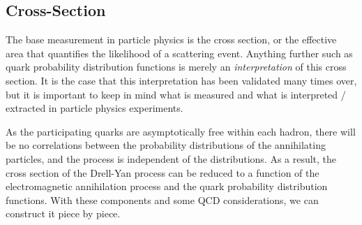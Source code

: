\subsection{Cross-Section}

The base measurement in particle physics is the cross section, or the effective area that quantifies the likelihood of a scattering event. Anything further such as quark probability distribution functions is merely an \emph{interpretation} of this cross section. It is the case that this interpretation has been validated many times over, but it is important to keep in mind what is measured and what is interpreted / extracted in particle physics experiments.

As the participating quarks are asymptotically free within each hadron, there will be no correlations between the probability distributions of the annihilating particles, and the process is independent of the distributions. As a result, the cross section of the Drell-Yan process can be reduced to a function of the electromagnetic annihilation process and the quark probability distribution functions. With these components and some QCD considerations, we can construct it piece by piece.

